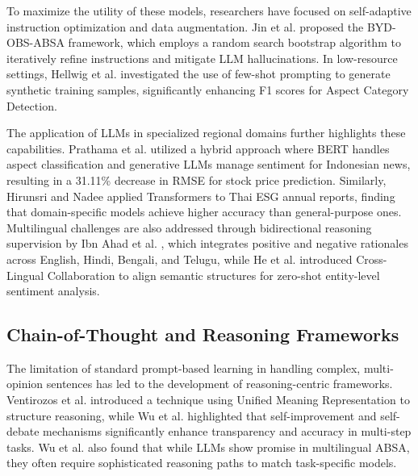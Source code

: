 To maximize the utility of these models, researchers have focused on self-adaptive instruction optimization and data augmentation. Jin et al.  \parencite{weiqiang_jin_5ccfa531} proposed the BYD-OBS-ABSA framework, which employs a random search bootstrap algorithm to iteratively refine instructions and mitigate LLM hallucinations. In low-resource settings, Hellwig et al.  \parencite{nils_constantin_hellwig_6fa4e097} investigated the use of few-shot prompting to generate synthetic training samples, significantly enhancing F1 scores for Aspect Category Detection.

The application of LLMs in specialized regional domains further highlights these capabilities. Prathama et al.  \parencite{ubaidillah_ariq_prathama_a1856e2f} utilized a hybrid approach where BERT handles aspect classification and generative LLMs manage sentiment for Indonesian news, resulting in a 31.11\% decrease in RMSE for stock price prediction. Similarly, Hirunsri and Nadee  \parencite{tharnsaithong_hirunsri_e4c4d75b} applied Transformers to Thai ESG annual reports, finding that domain-specific models achieve higher accuracy than general-purpose ones. Multilingual challenges are also addressed through bidirectional reasoning supervision by Ibn Ahad et al.  \parencite{association_for_computational_linguistics_2025_1ba46dee}, which integrates positive and negative rationales across English, Hindi, Bengali, and Telugu, while He et al.  \parencite{association_for_computational_linguistics_2025_5a25f994} introduced Cross-Lingual Collaboration to align semantic structures for zero-shot entity-level sentiment analysis.
\subsection{Chain-of-Thought and Reasoning Frameworks}

The limitation of standard prompt-based learning in handling complex, multi-opinion sentences has led to the development of reasoning-centric frameworks. Ventirozos et al.  \parencite{filippos_ventirozos_5976f1ad} introduced a technique using Unified Meaning Representation to structure reasoning, while Wu et al.  \parencite{chengyan_wu_4c659eab} highlighted that self-improvement and self-debate mechanisms significantly enhance transparency and accuracy in multi-step tasks. Wu et al.  \parencite{chengyan_wu_4c659eab} also found that while LLMs show promise in multilingual ABSA, they often require sophisticated reasoning paths to match task-specific models.

